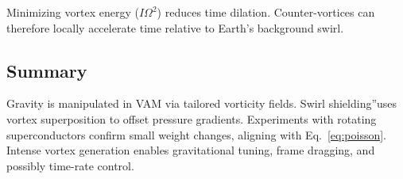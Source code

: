 Minimizing vortex energy ($I\Omega^2$) reduces time dilation. Counter-vortices can therefore locally accelerate time relative to Earth's background swirl.

\subsection{Summary}
Gravity is manipulated in VAM via tailored vorticity fields. \grqq Swirl shielding\textquotedblright uses vortex superposition to offset pressure gradients. Experiments with rotating superconductors confirm small weight changes, aligning with Eq.~\eqref{eq:poisson}. Intense vortex generation enables gravitational tuning, frame dragging, and possibly time-rate control.